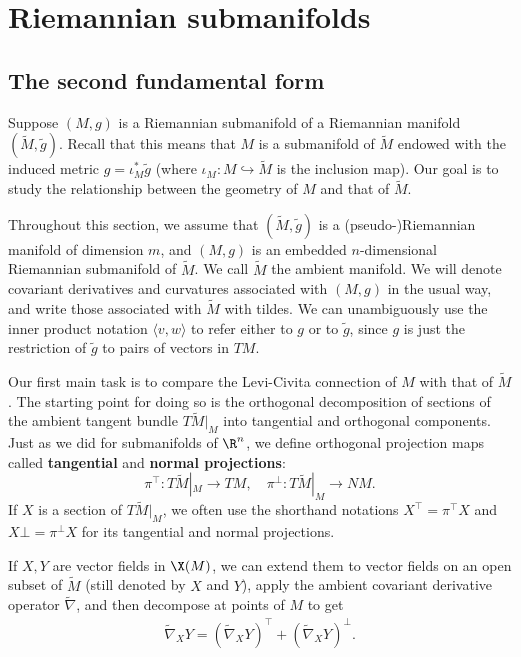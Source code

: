 \section{Riemannian submanifolds}
\subsection{The second fundamental form}
Suppose $(M,g)$ is a Riemannian submanifold of a Riemannian manifold $(\widetilde{M},\tilde{g})$. Recall that this means that $M$ is a submanifold of $\widetilde{M}$ endowed with the induced metric $g=\iota_M^*\tilde{g}$ (where $\iota_M:M\hookrightarrow\widetilde{M}$ is the inclusion map). Our goal is to study the relationship between the geometry of $M$ and that of $\widetilde{M}$.\par
Throughout this section, we assume that $(\widetilde{M},\tilde{g})$ is a (pseudo-)Riemannian manifold of dimension $m$, and $(M,g)$ is an embedded $n$-dimensional Riemannian submanifold of $\widetilde{M}$. We call $\widetilde{M}$ the ambient manifold. We will denote covariant derivatives and curvatures associated with $(M,g)$ in the usual way, and write those associated with $\widetilde{M}$ with tildes. We can unambiguously use the inner product notation $\langle v,w\rangle$ to refer either to $g$ or to $\tilde{g}$, since $g$ is just the restriction of $\tilde{g}$ to pairs of vectors in $TM$.\par
Our first main task is to compare the Levi-Civita connection of $M$ with that of $\widetilde{M}$. The starting point for doing so is the orthogonal decomposition of sections of the ambient tangent bundle $T\widetilde{M}|_M$ into tangential and orthogonal components. Just as we did for submanifolds of $\R^n$, we define orthogonal projection maps called \textbf{tangential} and \textbf{normal projections}:
\[\pi^{\top}:T\widetilde{M}|_M\to TM,\quad \pi^{\bot}:T\widetilde{M}|_M\to NM.\]
If $X$ is a section of $T\widetilde{M}|_M$, we often use the shorthand notations $X^\top=\pi^{\top}X$ and $X\bot=\pi^\bot X$ for its tangential and normal projections.\par
If $X,Y$ are vector fields in $\X(M)$, we can extend them to vector fields on an open subset of $\widetilde{M}$ (still denoted by $X$ and $Y$), apply the ambient covariant derivative operator $\widetilde{\nabla}$, and then decompose at points of $M$ to get
\begin{align}\label{Riemann connection submani decomp}
\widetilde{\nabla}_XY=(\widetilde{\nabla}_XY)^\top+(\widetilde{\nabla}_XY)^\bot.
\end{align}

